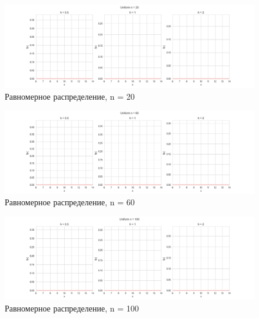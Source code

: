 \documentclass[../main.tex]{subfiles}
\begin{document}
    \begin{figure}[H]
        \centering
        \includegraphics[scale=0.5]{figures/UniformNuclear20.png}
        \caption{Равномерное распределение, n = 20}
        \label{fig:normal}
    \end{figure}
    
    \begin{figure}[H]
        \centering
        \includegraphics[scale=0.5]{figures/UniformNuclear60.png}
        \caption{Равномерное распределение, n = 60}
        \label{fig:normal}
    \end{figure}
    
    \begin{figure}[H]
        \centering
        \includegraphics[scale=0.5]{figures/UniformNuclear100.png}
        \caption{Равномерное распределение, n = 100}
        \label{fig:normal}
    \end{figure}
\end{document}
